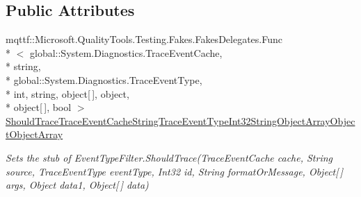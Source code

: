 \subsection*{Public Attributes}
\begin{DoxyCompactItemize}
\item 
mqttf\-::\-Microsoft.\-Quality\-Tools.\-Testing.\-Fakes.\-Fakes\-Delegates.\-Func\\*
$<$ global\-::\-System.\-Diagnostics.\-Trace\-Event\-Cache, \\*
string, \\*
global\-::\-System.\-Diagnostics.\-Trace\-Event\-Type, \\*
int, string, object\mbox{[}$\,$\mbox{]}, object, \\*
object\mbox{[}$\,$\mbox{]}, bool $>$ \hyperlink{class_system_1_1_diagnostics_1_1_fakes_1_1_stub_event_type_filter_a45ea196f63cc173d0a0dd667b5c7883e}{Should\-Trace\-Trace\-Event\-Cache\-String\-Trace\-Event\-Type\-Int32\-String\-Object\-Array\-Object\-Object\-Array}
\begin{DoxyCompactList}\small\item\em Sets the stub of Event\-Type\-Filter.\-Should\-Trace(\-Trace\-Event\-Cache cache, String source, Trace\-Event\-Type event\-Type, Int32 id, String format\-Or\-Message, Object\mbox{[}$\,$\mbox{]} args, Object data1, Object\mbox{[}$\,$\mbox{]} data)\end{DoxyCompactList}\end{DoxyCompactItemize}
